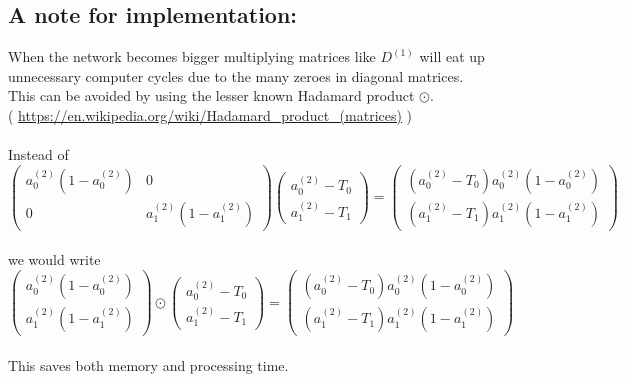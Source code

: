 \documentclass{article}
\begin{document}
\subsection*{A note for implementation:}
When the network becomes bigger multiplying matrices like $D^{(1)}$ will eat up unnecessary computer cycles due to the many zeroes in diagonal matrices.
\\
This can be avoided by using the lesser known Hadamard product $\odot$. 
\\
( \url{https://en.wikipedia.org/wiki/Hadamard_product_(matrices)} )
\\
\\
Instead of
\[
\begin{pmatrix}
a_{0}^{(2)}(1-a_{0}^{(2)}) & 0 \\
0 & a_{1}^{(2)}(1-a_{1}^{(2)})
\end{pmatrix}
\begin{pmatrix}
a_{0}^{(2)}-T_0 \\ a_{1}^{(2)}-T_1
\end{pmatrix} =
\begin{pmatrix}
(a_0^{(2)}-T_0)a_0^{(2)}(1-a_0^{(2)}) \\ (a_1^{(2)}-T_1)a_1^{(2)}(1-a_1^{(2)})
\end{pmatrix}
\]
\\
we would write
\\
\[
\begin{pmatrix}
a_{0}^{(2)}(1-a_{0}^{(2)}) \\
a_{1}^{(2)}(1-a_{1}^{(2)})
\end{pmatrix}
\odot
\begin{pmatrix}
a_{0}^{(2)}-T_0 \\ a_{1}^{(2)}-T_1
\end{pmatrix} =
\begin{pmatrix}
(a_0^{(2)}-T_0)a_0^{(2)}(1-a_0^{(2)}) \\ (a_1^{(2)}-T_1)a_1^{(2)}(1-a_1^{(2)})
\end{pmatrix}
\]
\\
This saves both memory and processing time.
\\
\\
\end{document}
